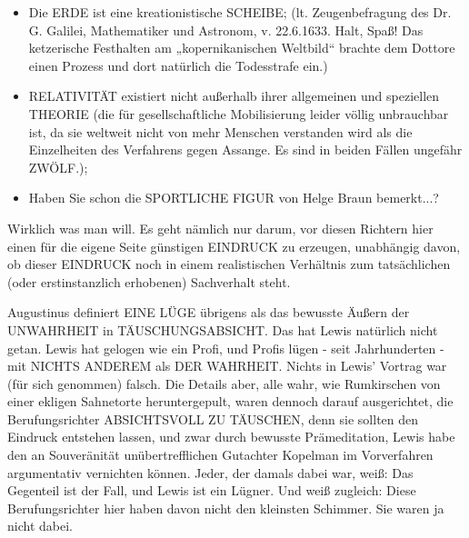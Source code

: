 \begin{multicols}{2}
\begin{itemize}
	\item Die ERDE ist eine kreationistische SCHEIBE; (lt. Zeugenbefragung des Dr. G. Galilei, Mathematiker und Astronom, v. 22.6.1633. Halt, Spaß! Das ketzerische Festhalten am „kopernikanischen Weltbild“ brachte dem Dottore einen Prozess und dort natürlich die Todesstrafe ein.)
	\item RELATIVITÄT existiert nicht außerhalb ihrer allgemeinen und speziellen THEORIE (die für gesellschaftliche Mobilisierung leider völlig unbrauchbar ist, da sie weltweit nicht von mehr Menschen verstanden wird als die Einzelheiten des Verfahrens gegen Assange. Es sind in beiden Fällen ungefähr ZWÖLF.);
	\item Haben Sie schon die SPORTLICHE FIGUR von Helge Braun bemerkt...?
\end{itemize}

Wirklich was man will. Es geht nämlich nur darum, vor
diesen Richtern hier einen für die eigene Seite günstigen
EINDRUCK zu erzeugen, unabhängig davon, ob dieser
EINDRUCK noch in einem realistischen Verhältnis zum
tatsächlichen (oder erstinstanzlich erhobenen) Sachverhalt steht.

Augustinus definiert EINE LÜGE übrigens als das bewusste Äußern der UNWAHRHEIT in TÄUSCHUNGSABSICHT. Das hat Lewis natürlich nicht getan. Lewis hat
gelogen wie ein Profi, und Profis lügen - seit Jahrhunderten - mit NICHTS ANDEREM als DER WAHRHEIT.
Nichts in Lewis’ Vortrag war (für sich genommen) falsch.
Die Details aber, alle wahr, wie Rumkirschen von einer
ekligen Sahnetorte heruntergepult, waren dennoch darauf ausgerichtet, die Berufungsrichter ABSICHTSVOLL ZU TÄUSCHEN, denn sie sollten den Eindruck entstehen lassen, und zwar durch bewusste Prämeditation,
Lewis habe den an Souveränität unübertrefflichen Gutachter Kopelman im Vorverfahren argumentativ vernichten können. Jeder, der damals dabei war, weiß: Das
Gegenteil ist der Fall, und Lewis ist ein Lügner. Und weiß
zugleich: Diese Berufungsrichter hier haben davon nicht
den kleinsten Schimmer. Sie waren ja nicht dabei.


\end{multicols}

